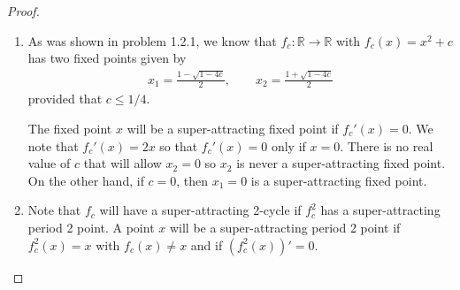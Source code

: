 \begin{proof}
  \begin{enumerate}
    \item As was shown in problem 1.2.1, we know that $f_c:\mathbb{R}\to\mathbb{R}$ with $f_c(x) = x^2 + c$
      has two fixed points given by
      \begin{align}\label{fixed}
        x_1 = \frac{1 - \sqrt{1 - 4c}}{2}, \qquad         x_2 = \frac{1 + \sqrt{1 - 4c}}{2}
      \end{align}
      provided that $ c \leq 1/4$.

      The fixed point $x$ will be a super-attracting fixed point if $f_c'(x) = 0$.
      We note that $f_c'(x) = 2x$ so that $f_c'(x) = 0$ only if $x=0$.
      There is no real value of $c$ that will allow $x_2=0$ so $x_2$ is never a
      super-attracting fixed point. On the other hand, if $c=0$,
      then $x_1 = 0$ is a super-attracting fixed point.
    \item Note that $f_c$ will have a super-attracting 2-cycle if $f_c^2$ has a super-attracting
      period 2 point. A point $x$ will be a super-attracting period 2 point
      if $f_c^2(x) = x$ with $f_c(x) \neq x$ and if $(f_c^2(x))' = 0$.


\end{enumerate}
\end{proof}
